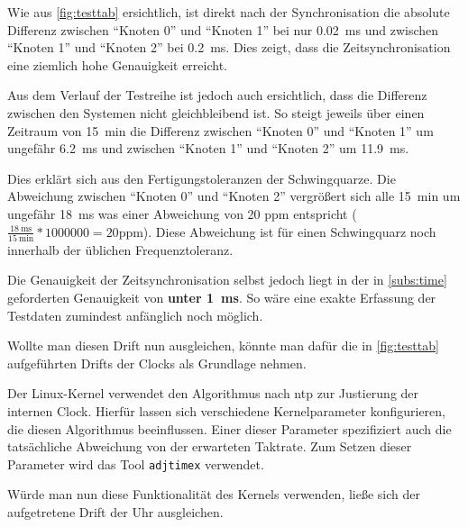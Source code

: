 Wie aus \autoref{fig:testtab} ersichtlich, ist direkt nach der Synchronisation
die absolute Differenz zwischen "`Knoten 0"' und "`Knoten 1"' bei nur
\SI{0.02}{\ms} und zwischen "`Knoten 1"' und "`Knoten 2"' bei \SI{0.2}{\ms}.
Dies zeigt, dass die Zeitsynchronisation eine ziemlich hohe Genauigkeit erreicht.

Aus dem Verlauf der Testreihe ist jedoch auch ersichtlich, dass die Differenz
zwischen den Systemen nicht gleichbleibend ist. So steigt jeweils über einen
Zeitraum von \SI{15}{\minute} die Differenz zwischen "`Knoten 0"' und "`Knoten
1"' um ungefähr \SI{6,2}{\ms} und zwischen "`Knoten 1"' und "`Knoten 2"' um
\SI{11,9}{\ms}.

Dies erklärt sich aus den Fertigungstoleranzen der Schwingquarze. Die Abweichung
zwischen "`Knoten 0"' und "`Knoten 2"' vergrößert sich alle \SI{15}{\minute} um
ungefähr \SI{18}{\ms} was einer Abweichung von 20 ppm entspricht
($\frac{\SI{18}{\ms}}{\SI{15}{\minute}}*1000000=20 \text{ppm}$).
Diese Abweichung ist für einen Schwingquarz noch innerhalb der üblichen
Frequenztoleranz.

Die Genauigkeit der Zeitsynchronisation selbst jedoch liegt in der in
\autoref{subs:time} geforderten Genauigkeit von \textbf{unter \SI{1}{\ms}}. So
wäre eine exakte Erfassung der Testdaten zumindest anfänglich noch möglich.

Wollte man diesen Drift nun ausgleichen, könnte man dafür die in
\autoref{fig:testtab} aufgeführten Drifts der Clocks als Grundlage nehmen.

Der Linux-Kernel verwendet den Algorithmus nach \gls{ntp}\cite{RFC1305} zur
Justierung der internen Clock. Hierfür lassen sich verschiedene Kernelparameter
konfigurieren, die diesen Algorithmus beeinflussen. Einer dieser Parameter
spezifiziert auch die tatsächliche Abweichung von der erwarteten Taktrate. Zum
Setzen dieser Parameter wird das Tool \texttt{adjtimex} verwendet.

Würde man nun diese Funktionalität des Kernels verwenden, ließe sich der
aufgetretene Drift der Uhr ausgleichen.